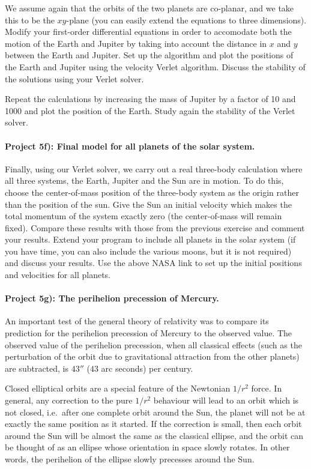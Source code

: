 \documentclass[%
oneside,                 %
final,                   %
10pt]{article}
\begin{document}
We assume again that the orbits of the two planets are co-planar, and we take this to be the $xy$-plane (you can easily extend the equations to three dimensions). 
Modify your first-order differential equations in order to accomodate both the
motion of the Earth and Jupiter by taking into account the distance in $x$ and
$y$ between the Earth and Jupiter. Set up the algorithm and plot the positions of the Earth and Jupiter using the velocity Verlet algorithm.
Discuss the stability of the solutions using your Verlet solver.

Repeat 
the calculations by increasing the mass of Jupiter by a factor of 10 and 1000
 and plot the position of the Earth.  Study again the stability of the Verlet solver.

\paragraph{Project 5f): Final model for all planets of the solar system.}
Finally, using our Verlet solver, we carry out a real three-body calculation where all three systems, 
the Earth, Jupiter and the Sun are in motion. To do this, choose the center-of-mass position of the three-body system as 
the origin rather than the position of the sun. Give the Sun an initial velocity which makes the total momentum of the system exactly zero (the center-of-mass will remain fixed). Compare these results with those from the previous exercise and comment your results. Extend your program to include all planets in the solar system (if you have time, you can also include the various moons, but it is not required) and discuss your results. Use the above NASA link  to set up the initial positions and velocities for all planets. 


\paragraph{Project 5g): The perihelion precession of Mercury.}
An important test of the general theory of relativity was to compare its prediction for the
perihelion precession of Mercury to the observed value. The observed value of the perihelion precession, when
all classical effects (such as the perturbation of the orbit due to gravitational attraction from the other planets) are
subtracted, is $43''$ ($43$ arc seconds) per century.

Closed elliptical orbits are a special feature of the Newtonian $1/r^2$ force. In general, any correction to the
pure $1/r^2$ behaviour will lead to an orbit which is not closed, i.e.~after one complete orbit around the Sun, the
planet will not be at exactly the same position as it started. If the correction is small, then each orbit around
the Sun will be almost the same as the classical ellipse, and the orbit can be thought of as an ellipse whose 
orientation in space slowly rotates. In other words, the perihelion of the ellipse slowly precesses around the Sun.
\end{document}
